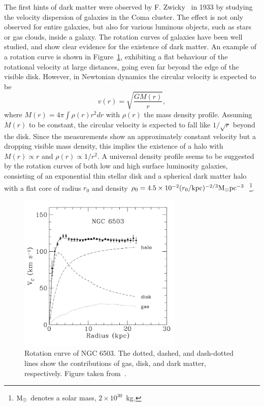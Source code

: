 The first hints of dark matter were observed by F. Zwicky~\cite{Zwicky:1933gu} in 1933 by studying the velocity dispersion of galaxies in the Coma cluster. The effect is not only observed for entire galaxies, but also for various luminous objects, such as stars or gas clouds, inside a galaxy. The rotation curves of galaxies have been well studied, and show clear evidence for the existence of dark matter. An example of a rotation curve is shown in Figure~\ref{fig:rotationcurves}, exhibiting a flat behaviour of the rotational velocity at large distances, going even far beyond the edge of the visible disk. However, in Newtonian dynamics the circular velocity is expected to be
\begin{equation}
 v(r) = \sqrt{\frac{GM(r)}{r}},
\end{equation}
where $M(r) = 4\pi\int\rho(r)r^2dr$ with $\rho(r)$ the mass density profile. Assuming $M(r)$ to be constant, the circular velocity is expected to fall like $1/\sqrt{r}$ beyond the disk. Since the measurements show an approximately constant velocity but a dropping visible mass density, this implies the existence of a halo with $M(r) \propto r$ and $\rho(r)\propto1/r^2$. A universal density profile seems to be suggested by the rotation curves of both low and high surface luminosity galaxies, consisting of an exponential thin stellar disk and a spherical dark matter halo with a flat core of radius $r_0$ and density $\rho_0 = 4.5\times 10^{-2}(r_0/\textup{kpc})^{-2/3}\textup{M}_\odot\textup{pc}^{-3}$~\cite{Salucci:2002jg}\footnote{$\textup{M}_\odot$ denotes a solar mass, $2 \times 10^{30}$~kg.}.

\begin{figure}[ht]
  \centering
  \includegraphics[width=0.7\textwidth]{rotational_curve.png}\hfill%
  \caption{Rotation curve of NGC 6503. The dotted, dashed, and dash-dotted lines show the contributions of gas, disk, and dark matter, respectively. Figure taken from~\cite{Begeman:1991iy}.}
  \label{fig:rotationcurves}
\end{figure}

